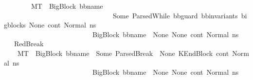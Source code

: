 \begin{isabellebody}
\ \ \ \ \ \ \ {\isasymLongrightarrow}\ M{\isacharcomma}{\kern0pt}{\isasymLambda}{\isacharcomma}{\kern0pt}{\isasymGamma}{\isacharcomma}{\kern0pt}{\isasymOmega}{\isacharcomma}{\kern0pt}T\ {\isasymturnstile}\ {\isasymlangle}{\isacharparenleft}{\kern0pt}{\isacharparenleft}{\kern0pt}BigBlock\ bb{\isacharunderscore}{\kern0pt}name\ {\isacharbrackleft}{\kern0pt}{\isacharbrackright}{\kern0pt}\ \isanewline
\ \ \ \ \ \ \ \ \ \ \ \ \ \ \ \ \ \ \ \ \ \ \ \ \ \ \ \ \ \ \ \ {\isacharparenleft}{\kern0pt}Some\ {\isacharparenleft}{\kern0pt}ParsedWhile\ bb{\isacharunderscore}{\kern0pt}guard\ bb{\isacharunderscore}{\kern0pt}invariants\ bigblocks{\isacharparenright}{\kern0pt}{\isacharparenright}{\kern0pt}\ None{\isacharparenright}{\kern0pt}{\isacharcomma}{\kern0pt}\ cont{}{\isacharcomma}{\kern0pt}\ Normal\ n{\isacharunderscore}{\kern0pt}s{\isacharparenright}{\kern0pt}{\isasymrangle}\ {\isasymlongrightarrow}\ \isanewline
\ \ \ \ \ \ \ \ \ \ \ \ \ \ \ \ \ \ \ \ \ \ \ \ \ \ {\isacharparenleft}{\kern0pt}{\isacharparenleft}{\kern0pt}BigBlock\ bb{\isacharunderscore}{\kern0pt}name\ {\isacharbrackleft}{\kern0pt}{\isacharbrackright}{\kern0pt}\ None\ None{\isacharparenright}{\kern0pt}{\isacharcomma}{\kern0pt}\ cont{}{\isacharcomma}{\kern0pt}\ Normal\ n{\isacharunderscore}{\kern0pt}s{\isacharparenright}{\kern0pt}{\isachardoublequoteclose}\isanewline
\isanewline
\ \ {\isacharbar}{\kern0pt}\ RedBreak{}{\isacharcolon}{\kern0pt}\ \isanewline
\ \ \ \ {\isachardoublequoteopen}M{\isacharcomma}{\kern0pt}{\isasymLambda}{\isacharcomma}{\kern0pt}{\isasymGamma}{\isacharcomma}{\kern0pt}{\isasymOmega}{\isacharcomma}{\kern0pt}T\ {\isasymturnstile}\ {\isasymlangle}{\isacharparenleft}{\kern0pt}{\isacharparenleft}{\kern0pt}BigBlock\ bb{\isacharunderscore}{\kern0pt}name\ {\isacharbrackleft}{\kern0pt}{\isacharbrackright}{\kern0pt}\ {\isacharparenleft}{\kern0pt}Some\ {\isacharparenleft}{\kern0pt}ParsedBreak\ {}{\isacharparenright}{\kern0pt}{\isacharparenright}{\kern0pt}\ None{\isacharparenright}{\kern0pt}{\isacharcomma}{\kern0pt}\ {\isacharparenleft}{\kern0pt}KEndBlock\ cont{}{\isacharparenright}{\kern0pt}{\isacharcomma}{\kern0pt}\ Normal\ n{\isacharunderscore}{\kern0pt}s{\isacharparenright}{\kern0pt}{\isasymrangle}\ {\isasymlongrightarrow}\ \isanewline
\ \ \ \ \ \ \ \ \ \ \ \ \ \ \ \ \ \ \ \ \ \ \ \ \ \ {\isacharparenleft}{\kern0pt}{\isacharparenleft}{\kern0pt}BigBlock\ bb{\isacharunderscore}{\kern0pt}name\ {\isacharbrackleft}{\kern0pt}{\isacharbrackright}{\kern0pt}\ None\ None{\isacharparenright}{\kern0pt}{\isacharcomma}{\kern0pt}\ cont{}{\isacharcomma}{\kern0pt}\ Normal\ n{\isacharunderscore}{\kern0pt}s{\isacharparenright}{\kern0pt}{\isachardoublequoteclose}\isanewline

\end{isabellebody}
